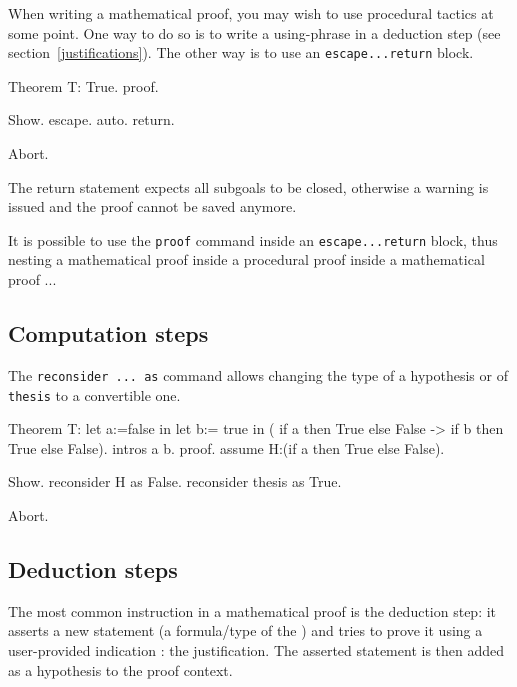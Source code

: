 When writing a mathematical proof, you may wish to use procedural
tactics at some point. One way to do so is to write a using-{}phrase
in a deduction step (see section~\ref{justifications}). The other way
is to use an {\texttt{escape...return}} block.

\begin{coq_eval}  
Theorem T: True.
proof.
\end{coq_eval}
\begin{coq_example}
 Show.
 escape.
 auto.
 return.
\end{coq_example}
\begin{coq_eval}
Abort.
\end{coq_eval}

The return statement expects all subgoals to be closed, otherwise a
warning is issued and the proof cannot be saved anymore.

It is possible to use the {\texttt{proof}} command inside an
{\texttt{escape...return}} block, thus nesting a mathematical proof
inside a procedural proof inside a mathematical proof ...

\subsection{Computation steps}

The {\tt reconsider ... as} command allows changing the type of a hypothesis or of {\tt thesis} to a convertible one.

\begin{coq_eval}
Theorem T: let a:=false in let b:= true in ( if a then True else False -> if b then True else False).
intros a b.
proof.
assume H:(if a then True else False).
\end{coq_eval}
\begin{coq_example}
 Show.
 reconsider H as False.
 reconsider thesis as True.
\end{coq_example}
\begin{coq_eval}
Abort.
\end{coq_eval}


\subsection{Deduction steps}

The most common instruction in a mathematical proof is the deduction step:
 it asserts a new statement (a formula/type of the \CIC) and tries to prove it using a user-provided indication : the justification. The asserted statement is then added as a hypothesis to the proof context.

